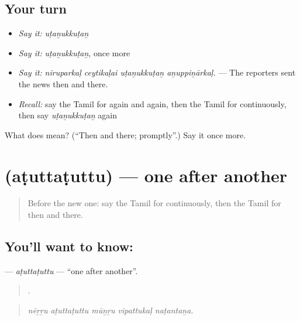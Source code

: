 \subsection*{Your turn}
\begin{itemize}
\raggedright
  \item \emph{Say it:} \emph{uṭaṉukkuṭaṉ}
  \item \emph{Say it:} \emph{uṭaṉukkuṭaṉ}, once more
  \item \emph{Say it:} \emph{niruparkaḷ ceytikaḷai uṭaṉukkuṭaṉ aṉuppiṉārkaḷ.} — The reporters sent the news then and there.
  \item \emph{Recall:} say the Tamil for again and again, then the Tamil for continuously, then say \emph{uṭaṉukkuṭaṉ} again
\end{itemize}

\begin{tcolorbox}[breakable,colback=teal!4,colframe=teal!35!black,title={Before you move on}]
What does  mean? (\textquotedblleft{}Then and there; promptly\textquotedblright{}.) Say it once more.
\end{tcolorbox}
\section[\texorpdfstring{\ta{அடுத்தடுத்து} (aṭuttaṭuttu)}{அடுத்தடுத்து (aṭuttaṭuttu)}]{ (aṭuttaṭuttu) — one after another}

\label{lesson:TA-C317-atuttatuttu}



\begin{quote}
Before the new one: say the Tamil for continuously, then the Tamil for then and there.
\end{quote}

\subsection*{You'll want to know: }
\textbf{} — \emph{aṭuttaṭuttu} — \textquotedblleft{}one after another\textquotedblright{}.

\begin{quote}
    .
\end{quote}

\begin{quote}
\emph{nēṟṟu aṭuttaṭuttu mūṉṟu vipattukaḷ naṭantaṉa.}
\end{quote}

